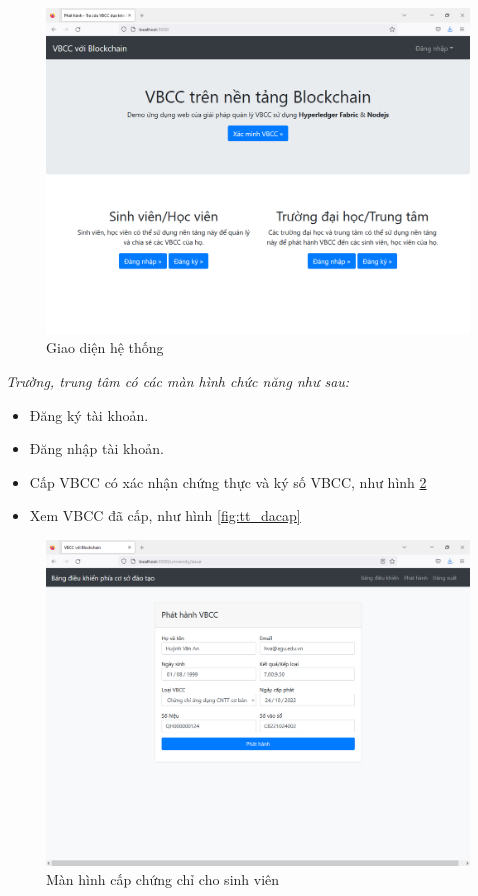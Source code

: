 \begin{figure}[htbp]
\centering
\includegraphics[width=.9\linewidth]{img/main_vbcc.png}
\caption{Giao diện hệ thống}
\label{fig:main_vbcc}
\end{figure}

\emph{Trường, trung tâm có các màn hình chức năng như sau:}

\begin{itemize}
\item Đăng ký tài khoản.

\item Đăng nhập tài khoản.

\item Cấp VBCC có xác nhận chứng thực và ký số VBCC, như hình \ref{fig:tt_phathanh}

\item Xem VBCC đã cấp, như hình \ref{fig:tt_dacap}

\end{itemize}

\begin{figure}[htbp]
\centering
\includegraphics[width=.9\linewidth]{img/tt_phathanh.PNG}
\caption{Màn hình cấp chứng chỉ cho sinh viên}
\label{fig:tt_phathanh}
\end{figure}

